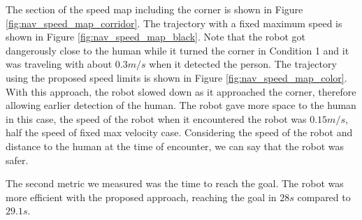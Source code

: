 The section of the speed map including the corner is shown in Figure \ref{fig:nav_speed_map_corridor}. The trajectory with a fixed maximum speed is shown in Figure \ref{fig:nav_speed_map_black}. Note that the robot got dangerously close to the human while it turned the corner in Condition 1 and it was traveling with about $0.3m/s$ when it detected the person. The trajectory using the proposed speed limits is shown in Figure \ref{fig:nav_speed_map_color}. With this approach, the robot slowed down as it approached the corner, therefore allowing earlier detection of the human. The robot gave more space to the human in this case, the speed of the robot when it encountered the robot was  $0.15m/s$, half the speed of fixed max velocity case. Considering the speed of the robot and distance to the human at the time of encounter, we can say that the robot was safer.

The second metric we measured was the time to reach the goal. The robot was more efficient with the proposed approach, reaching the goal in $28s$ compared to $29.1s$.



